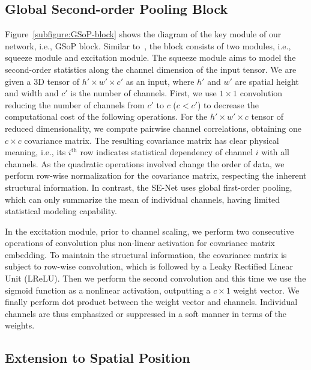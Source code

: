 \documentclass[10pt,twocolumn,letterpaper]{article}
\begin{document}
\subsection{Global Second-order Pooling  Block}\label{subsection:channel-block}

Figure~\ref{subfigure:GSoP-block} shows the diagram of the key module of our network, i.e., GSoP block. Similar to~\cite{Hu_2018_CVPR_SE},  the block  consists of two modules, i.e., squeeze module and excitation module. The squeeze module aims to model the  second-order statistics along the channel dimension of the input tensor. We are given a 3D  tensor of $h'\times w' \times c'$ as an input, where $h'$ and $w'$ are spatial height and width  and $c'$ is the number of channels. First, we use  $1\times 1$ convolution reducing the number of channels from $c'$ to $c$ ($c<c'$) to decrease the computational cost of the following operations. For the   $h'\times w' \times c$ tensor of reduced dimensionality, we compute pairwise channel correlations, obtaining one $c\times c$ covariance matrix. The resulting covariance matrix has clear physical meaning, i.e., its  $i^\mathrm{th}$ row indicates statistical dependency of channel $i$  with all channels. As the quadratic operations involved change  the order of data, we perform row-wise normalization for the covariance matrix, respecting the inherent structural information. In contrast, the SE-Net  uses global first-order pooling,  which can only summarize the mean  of individual channels, having limited statistical  modeling capability. 

In the excitation module, prior to channel scaling, we perform two consecutive operations of convolution plus non-linear activation for covariance matrix embedding. To maintain the structural information, the covariance matrix is subject to row-wise convolution, which is followed by a Leaky Rectified Linear Unit (LReLU). Then we perform the second convolution and this time we use the sigmoid function as a nonlinear activation, outputting  a $c\times 1$ weight vector. We finally perform dot product between the weight vector and  channels. Individual channels are thus  emphasized or suppressed in a soft manner in terms of the weights. 

   
\subsection{Extension to Spatial Position}\label{subsection:position-block}
\end{document}
